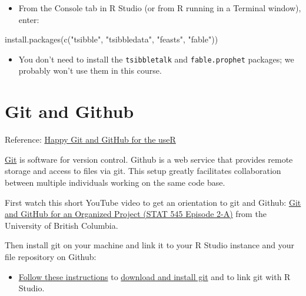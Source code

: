 \documentclass[
]{book}
\newenvironment{Shaded}{\begin{snugshade}}{\end{snugshade}}
\newcommand{\FunctionTok}[1]{\textcolor[rgb]{0.00,0.00,0.00}{#1}}
\newcommand{\NormalTok}[1]{#1}
\newcommand{\StringTok}[1]{\textcolor[rgb]{0.31,0.60,0.02}{#1}}
\providecommand{\tightlist}{%
  \setlength{\itemsep}{0pt}\setlength{\parskip}{0pt}}
\begin{document}
\begin{itemize}
\tightlist
\item
  From the Console tab in R Studio (or from R running in a Terminal window), enter:
\end{itemize}

\begin{Shaded}
\begin{Highlighting}[]
\FunctionTok{install.packages}\NormalTok{(}\FunctionTok{c}\NormalTok{(}\StringTok{"tsibble"}\NormalTok{, }\StringTok{"tsibbledata"}\NormalTok{, }\StringTok{"feasts"}\NormalTok{, }\StringTok{"fable"}\NormalTok{))}
\end{Highlighting}
\end{Shaded}

\begin{itemize}
\tightlist
\item
  You don't need to install the \texttt{tsibbletalk} and \texttt{fable.prophet} packages; we probably won't use them in this course.
\end{itemize}

\hypertarget{git-and-github}{%
\section{Git and Github}\label{git-and-github}}

Reference: \href{https://happygitwithr.com/}{Happy Git and GitHub for the useR}

\href{https://git-scm.com/}{Git} is software for version control. Github is a web service that provides remote storage and access to files via git. This setup greatly facilitates collaboration between multiple individuals working on the same code base.

First watch this short YouTube video to get an orientation to git and Github: \href{https://www.youtube.com/watch?v=l2ftm-YwJs8}{Git and GitHub for an Organized Project (STAT 545 Episode 2-A)} from the University of British Columbia.

Then install git on your machine and link it to your R Studio instance and your file repository on Github:

\begin{itemize}
\tightlist
\item
  \href{https://jennybc.github.io/2014-05-12-ubc/ubc-r/session03_git.html}{Follow these instructions} to \href{https://git-scm.com/downloads}{download and install git} and to link git with R Studio.
\end{itemize}
\end{document}
